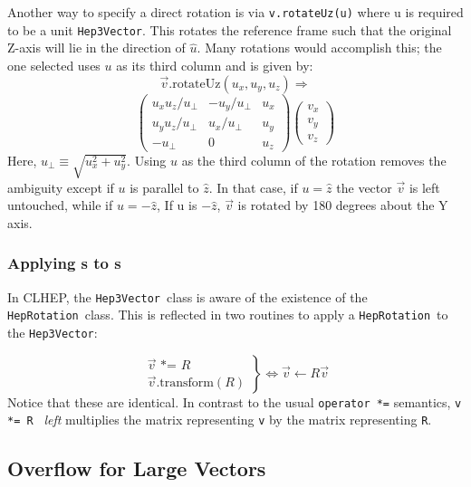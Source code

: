 \documentclass[twoside,12pt]{article}
\def \SV {{\tt Hep3Vector}}
\def \Ro {{\tt HepRotation}}
\begin{document}
Another way to specify a direct rotation is via {\tt v.rotateUz(u)}
where u is required to be a unit \SV .
This rotates the reference frame such that the original Z-axis will lie 
in the direction of $\hat{u}$.  Many rotations would accomplish this; the
one selected uses $u$ as its third column and is given by:
\[  \vec{v}.\mbox{rotateUz}(u_x, u_y, u_z)\Longrightarrow  \]
\begin{equation}
\label{eq:rotUz}
\left(
\begin{array}{ccc}
u_x u_z / u_\perp & - u_y / u_\perp & u_x \\
u_y u_z / u_\perp &   u_x / u_\perp & u_y \\
- u_\perp         &      0          & u_z
\end{array}
\right)
\left(
\begin{array}{c}
v_x\\
v_y\\
v_z
\end{array}
\right)
\end{equation}
\noindent
Here, $u_\perp \equiv \sqrt{u_x^2 + u_y^2}$.  Using $u$ as the third column of 
the rotation removes the ambiguity except if $u$ is parallel to $\hat{z}$.
In that case, if $u = \hat{z}$ the vector $\vec{v}$ is left untouched, 
while if 
$u = - \hat{z}$,
If u is $-\hat{z}$, $\vec{v}$ is rotated by 180 degrees about the Y axis.

\subsubsection{Applying \protect\Ro s to \protect\SV s}

In CLHEP, the \SV\ class is aware of the existence of the \Ro\ class.  
This is reflected in two routines to apply a \Ro\ to the \SV :

\begin{equation}
\label{eq:opstareq}
\left.
\begin{array} {r}
\vec{v} \mbox{ *= } R \\
\vec{v} \mbox{.transform} (R) 
\end{array}
\right\}
\Longleftrightarrow
\vec{v} \leftarrow R \vec{v}
\end{equation}
\noindent
Notice that these are identical.
In contrast to the usual {\tt operator *=} semantics, 
{\tt v *= R } {\it left} multiplies the matrix representing {\tt v} 
by the matrix representing {\tt R}.


\subsection{Overflow for Large Vectors}
\end{document}
